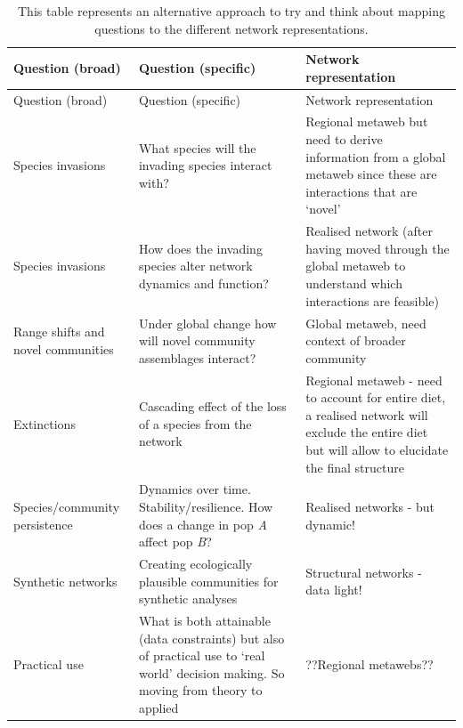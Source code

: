 \documentclass[
]{article}
\begin{document}
\begin{longtable}[]{@{}
  >{\raggedright\arraybackslash}p{}
  >{\raggedright\arraybackslash}p{}
  >{\raggedright\arraybackslash}p{}@{}}
\caption{This table represents an alternative approach to try and think
about mapping questions to the different network
representations.}\tabularnewline
\toprule\noalign{}
\begin{minipage}[b]{\linewidth}\raggedright
Question (broad)
\end{minipage} & \begin{minipage}[b]{\linewidth}\raggedright
Question (specific)
\end{minipage} & \begin{minipage}[b]{\linewidth}\raggedright
Network representation
\end{minipage} \\
\midrule\noalign{}
\endfirsthead
\toprule\noalign{}
\begin{minipage}[b]{\linewidth}\raggedright
Question (broad)
\end{minipage} & \begin{minipage}[b]{\linewidth}\raggedright
Question (specific)
\end{minipage} & \begin{minipage}[b]{\linewidth}\raggedright
Network representation
\end{minipage} \\
\midrule\noalign{}
\endhead
\bottomrule\noalign{}
\endlastfoot
Species invasions & What species will the invading species interact
with? & Regional metaweb but need to derive information from a global
metaweb since these are interactions that are `novel' \\
Species invasions & How does the invading species alter network dynamics
and function? & Realised network (after having moved through the global
metaweb to understand which interactions are feasible) \\
Range shifts and novel communities & Under global change how will novel
community assemblages interact? & Global metaweb, need context of
broader community \\
Extinctions & Cascading effect of the loss of a species from the network
& Regional metaweb - need to account for entire diet, a realised network
will exclude the entire diet but will allow to elucidate the final
structure \\
Species/community persistence & Dynamics over time.
Stability/resilience. How does a change in pop \emph{A} affect pop
\emph{B}? & Realised networks - but dynamic! \\
Synthetic networks & Creating ecologically plausible communities for
synthetic analyses & Structural networks - data light! \\
Practical use & What is both attainable (data constraints) but also of
practical use to `real world' decision making. So moving from theory to
applied & ??Regional metawebs?? \\
\end{longtable}
\end{document}

